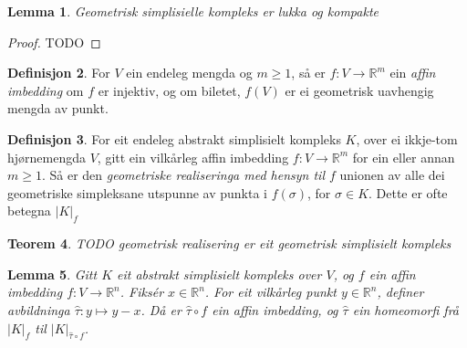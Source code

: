 \documentclass[a4paper, titlepage, 12pt, norsk]{article}
\theoremstyle{plain}
\newtheorem{theorem}{Teorem}[section]
\newtheorem{lemma}[theorem]{Lemma}
\theoremstyle{definition}
\newtheorem{definition}[theorem]{Definisjon}
\newcommand{\Rb}{\mathbb{R}}
\newcommand{\gr}[1]{ \lvert #1 \rvert } %
\begin{document}
\begin{lemma} \label{thm:geometrisk-kompleks-lukka}
	Geometrisk simplisielle kompleks er lukka og kompakte
\end{lemma}

\begin{proof}
	TODO
\end{proof}


\begin{definition}
	For $V$ ein endeleg mengda og $m\geq1$, så er $f:V\rightarrow \Rb^m$ ein \emph{affin imbedding} om $f$ er injektiv, og om biletet, $f(V)$ er ei geometrisk uavhengig mengda av punkt.
\end{definition}

\begin{definition}
	For eit endeleg abstrakt simplisielt kompleks $K$, over ei ikkje-tom hjørnemengda $V$, gitt ein vilkårleg affin imbedding $f:V\to\Rb^m$ for ein eller annan $m\geq1$. Så er den \emph{geometriske realiseringa med hensyn til $f$} unionen av alle dei geometriske simpleksane utspunne av punkta i $f(\sigma)$, for $\sigma\in K$. Dette er ofte betegna $\gr{K}_f$
\end{definition}

\begin{theorem}
	TODO geometrisk realisering er eit geometrisk simplisielt kompleks
\end{theorem}

\begin{lemma} \label{thm:tau-homeomorfi}
	Gitt \( K \) eit abstrakt simplisielt kompleks over \( V \), og \( f \) ein affin imbedding \( f: V \to \Rb^n \). Fiksér \( x \in \Rb^n \). For eit vilkårleg punkt \( y \in \Rb^n \), definer avbildninga \( \hat{\tau}: y \mapsto y-x \). Då er \( \hat{\tau} \circ f \) ein affin imbedding, og \( \hat{\tau} \) ein homeomorfi frå \( \gr{K}_f \) til \( \gr{K}_{\hat{\tau} \circ f} \).
\end{lemma}
\end{document}
